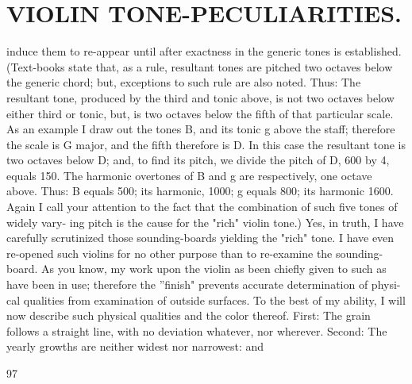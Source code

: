 \documentclass{article}
\begin{document}
\section*{VIOLIN TONE-PECULIARITIES.}
induce them to re-appear until after exactness in the generic tones is established. (Text-books state that, as a rule, resultant tones are pitched two octaves below the generic chord; but, exceptions to such rule are also noted. Thus: The resultant tone, produced by the third and tonic above, is not two octaves below either third or tonic, but, is two octaves below the fifth of that particular scale. As an example I draw out the tones B, and its tonic g above the staff; therefore the scale is G major, and the fifth therefore is D. In this case the resultant tone is two octaves below D; and, to find its pitch, we divide the pitch of D, 600 by 4, equals 150. The harmonic overtones of B and g are respectively, one octave above. Thus: B equals 500; its harmonic, 1000; g equals 800; its harmonic 1600. Again I call your attention to the fact that the combination of such five tones of widely vary- ing pitch is the cause for the "rich" violin tone.) Yes, in truth, I have carefully scrutinized those sounding-boards yielding the "rich" tone. I have even re-opened such violins for no other purpose than to re-examine the sounding-board. As you know, my work upon the violin as been chiefly given to such as have been in use; therefore the ''finish" prevents accurate determination of physi- cal qualities from examination of outside surfaces. To the best of my ability, I will now describe such physical qualities and the color thereof. First: The grain follows a straight line, with no deviation whatever, nor wherever. Second: The yearly growths are neither widest nor narrowest: and

97
\end{document}
